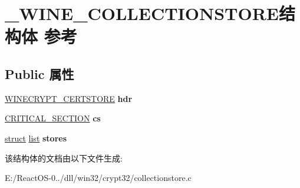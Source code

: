 \hypertarget{struct___w_i_n_e___c_o_l_l_e_c_t_i_o_n_s_t_o_r_e}{}\section{\+\_\+\+W\+I\+N\+E\+\_\+\+C\+O\+L\+L\+E\+C\+T\+I\+O\+N\+S\+T\+O\+R\+E结构体 参考}
\label{struct___w_i_n_e___c_o_l_l_e_c_t_i_o_n_s_t_o_r_e}
\subsection*{Public 属性}
\begin{DoxyCompactItemize}
\item 
\mbox{\label{struct___w_i_n_e___c_o_l_l_e_c_t_i_o_n_s_t_o_r_e_a5fabc95d60358c0e7a48b91553033be2}} 
\hyperlink{struct_w_i_n_e___c_r_y_p_t_c_e_r_t_s_t_o_r_e}{W\+I\+N\+E\+C\+R\+Y\+P\+T\+\_\+\+C\+E\+R\+T\+S\+T\+O\+RE} {\bfseries hdr}
\item 
\mbox{\label{struct___w_i_n_e___c_o_l_l_e_c_t_i_o_n_s_t_o_r_e_af53feb2da3be23f610e252ef8bd9e612}} 
\hyperlink{struct___c_r_i_t_i_c_a_l___s_e_c_t_i_o_n}{C\+R\+I\+T\+I\+C\+A\+L\+\_\+\+S\+E\+C\+T\+I\+ON} {\bfseries cs}
\item 
\mbox{\label{struct___w_i_n_e___c_o_l_l_e_c_t_i_o_n_s_t_o_r_e_abf45f836350060af729f23944a9a2982}} 
\hyperlink{interfacestruct}{struct} \hyperlink{classlist}{list} {\bfseries stores}
\end{DoxyCompactItemize}


该结构体的文档由以下文件生成\+:\begin{DoxyCompactItemize}
\item 
E\+:/\+React\+O\+S-\/0../dll/win32/crypt32/collectionstore.\+c\end{DoxyCompactItemize}
